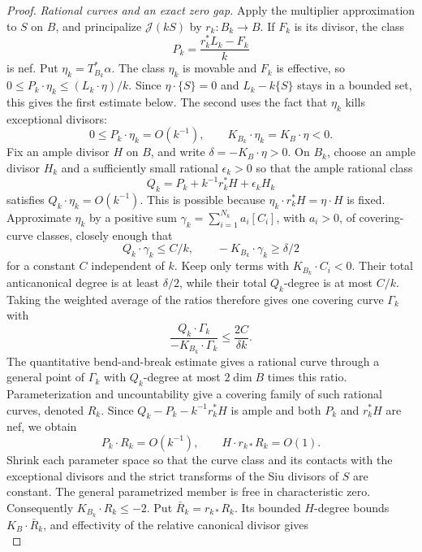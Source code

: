 \begin{proof}
\smallskip
\noindent\emph{Rational curves and an exact zero gap.}
Apply the multiplier approximation to \(S\) on \(B\), and
principalize \(\mathcal J(kS)\) by \(r_k:B_k\to B\).
If \(F_k\) is its divisor, the class
\[
 P_k=\frac{r_k^*L_k-F_k}{k}
\]
is nef. Put \(\eta_k=T_{B_k}^*\alpha\). The class \(\eta_k\)
is movable and \(F_k\) is effective, so
\(0\leq P_k\cdot\eta_k\leq (L_k\cdot\eta)/k\).
Since \(\eta\cdot\{S\}=0\) and \(L_k-k\{S\}\) stays in a
bounded set, this gives the first estimate below. The second
uses the fact that \(\eta_k\) kills exceptional divisors:
\[
 0\leq P_k\cdot\eta_k=O(k^{-1}),\qquad
 K_{B_k}\cdot\eta_k=K_B\cdot\eta<0.
\]
Fix an ample divisor \(H\) on \(B\), and write
\(\delta=-K_B\cdot\eta>0\). On \(B_k\), choose an ample
divisor \(H_k\) and a sufficiently small rational
\(\epsilon_k>0\) so that the ample rational class
\[
 Q_k=P_k+k^{-1}r_k^*H+\epsilon_k H_k
\]
satisfies \(Q_k\cdot\eta_k=O(k^{-1})\). This is possible
because \(\eta_k\cdot r_k^*H=\eta\cdot H\) is fixed.
Approximate \(\eta_k\) by a positive sum
\(\gamma_k=\sum_{i=1}^{N_k} a_i[C_i]\), with \(a_i>0\),
of covering-curve classes,
closely enough that
\[
 Q_k\cdot\gamma_k\leq C/k,\qquad
 -K_{B_k}\cdot\gamma_k\geq\delta/2
\]
for a constant \(C\) independent of \(k\). Keep only terms
with \(K_{B_k}\cdot C_i<0\). Their total anticanonical
degree is at least \(\delta/2\), while their total
\(Q_k\)-degree is at most \(C/k\). Taking the weighted
average of the ratios therefore gives one covering curve
\(\Gamma_k\) with
\[
 \frac{Q_k\cdot\Gamma_k}{-K_{B_k}\cdot\Gamma_k}
 \leq\frac{2C}{\delta k}.
\]
The quantitative bend-and-break estimate
\cite[Theorem~5]{MiyaokaMori1986} gives a rational curve
through a general point of \(\Gamma_k\) with \(Q_k\)-degree
at most \(2\dim B\) times this ratio. Parameterization and
uncountability give a covering family of such rational curves,
denoted \(R_k\). Since \(Q_k-P_k-k^{-1}r_k^*H\) is ample
and both \(P_k\) and \(r_k^*H\) are nef, we obtain
\begin{equation}\label{ex:small-curves}
 P_k\cdot R_k=O(k^{-1}),\qquad
 H\cdot r_{k*}R_k=O(1).
\end{equation}
Shrink each parameter space so that the curve class and its
contacts with the exceptional divisors and the strict transforms
of the Siu divisors of \(S\) are constant. The general parametrized
member is free in characteristic zero. Consequently
\(K_{B_k}\cdot R_k\leq-2\). Put \(\bar R_k=r_{k*}R_k\).
Its bounded \(H\)-degree bounds \(K_B\cdot\bar R_k\), and
effectivity of the relative canonical divisor gives
\begin{equation}\label{ex:contact-bound}

\end{equation}
\end{proof}
